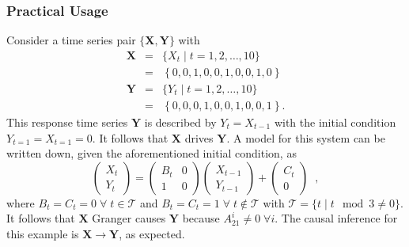 \documentclass{article}[10pt]
\begin{document}
\subsubsection{Practical Usage}
Consider a time series pair $\{\mathbf{X},\mathbf{Y}\}$ with
\begin{eqnarray*}
\mathbf{X} &=& \{X_t\; | \; t=1,2,\ldots,10\}\\
&=& \left\{0,0,1,0,0,1,0,0,1,0\right\}\\
\mathbf{Y} &=& \{Y_t\; | \; t=1,2,\ldots,10\}\\
&=& \left\{0,0,0,1,0,0,1,0,0,1\right\}.
\end{eqnarray*}
This response time series $\mathbf{Y}$ is described by $Y_t=X_{t-1}$ with the initial condition $Y_{t=1}=X_{t=1}=0$.  It follows that $\mathbf{X}$ drives $\mathbf{Y}$.  A model for this system can be written down, given the aforementioned initial condition, as
\begin{equation}
\label{eqn:GCsimpleex}
\begin{pmatrix}
X_t \\ 
Y_t
\end{pmatrix} = \begin{pmatrix}
B_t & 0\\
1 & 0
\end{pmatrix}\begin{pmatrix}
X_{t-1} \\ 
Y_{t-1}
\end{pmatrix}+
\begin{pmatrix}
C_t \\ 
0
\end{pmatrix}\;\;,
\end{equation}
where $B_t = C_t = 0\;\forall\;t\in \mathcal{T}$ and $B_t = C_t = 1\;\forall\;t\not\in \mathcal{T}$ with $\mathcal{T} = \{t\;|\;t\mod 3 \neq 0\}$.  It follows that $\mathbf{X}$ Granger causes $\mathbf{Y}$ because  $A_{21}^i\neq 0\;\forall i$.  The causal inference for this example is $\mathbf{X}\rightarrow\mathbf{Y}$, as expected.
\end{document}

